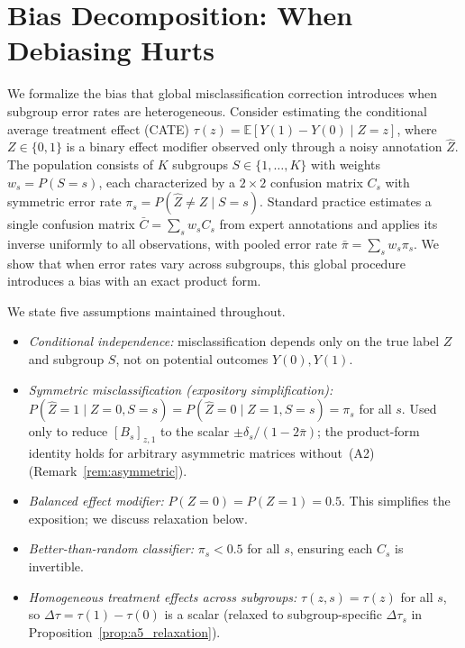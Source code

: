 
\section{Bias Decomposition: When Debiasing Hurts}
\label{sec:theory}

We formalize the bias that global misclassification correction introduces when subgroup error rates are heterogeneous.
Consider estimating the conditional average treatment effect (CATE) $\tau(z) = \mathbb{E}[Y(1) - Y(0) \mid Z = z]$, where $Z \in \{0, 1\}$ is a binary effect modifier observed only through a noisy annotation $\hat{Z}$.
The population consists of $K$ subgroups $S \in \{1, \ldots, K\}$ with weights $w_s = P(S{=}s)$, each characterized by a $2 \times 2$ confusion matrix $C_s$ with symmetric error rate $\pi_s = P(\hat{Z} \neq Z \mid S{=}s)$.
Standard practice estimates a single confusion matrix $\bar{C} = \sum_s w_s C_s$ from expert annotations and applies its inverse uniformly to all observations, with pooled error rate $\bar{\pi} = \sum_s w_s \pi_s$.
We show that when error rates vary across subgroups, this global procedure introduces a bias with an exact product form.

We state five assumptions maintained throughout.
%
\begin{itemize}
\item[\textbf{(A1)}] \textit{Conditional independence:} misclassification depends only on the true label $Z$ and subgroup $S$, not on potential outcomes $Y(0), Y(1)$.
\item[\textbf{(A2)}] \textit{Symmetric misclassification (expository simplification):} $P(\hat{Z}{=}1 \mid Z{=}0, S{=}s) = P(\hat{Z}{=}0 \mid Z{=}1, S{=}s) = \pi_s$ for all $s$. Used only to reduce $[B_s]_{z,1}$ to the scalar $\pm\delta_s/(1{-}2\bar{\pi})$; the product-form identity holds for arbitrary asymmetric matrices without~(A2) (Remark~\ref{rem:asymmetric}).
\item[\textbf{(A3)}] \textit{Balanced effect modifier:} $P(Z{=}0) = P(Z{=}1) = 0.5$. This simplifies the exposition; we discuss relaxation below.
\item[\textbf{(A4)}] \textit{Better-than-random classifier:} $\pi_s < 0.5$ for all $s$, ensuring each $C_s$ is invertible.
\item[\textbf{(A5)}] \textit{Homogeneous treatment effects across subgroups:} $\tau(z, s) = \tau(z)$ for all $s$, so $\Delta\tau = \tau(1) - \tau(0)$ is a scalar (relaxed to subgroup-specific $\Delta\tau_s$ in Proposition~\ref{prop:a5_relaxation}).
\end{itemize}

